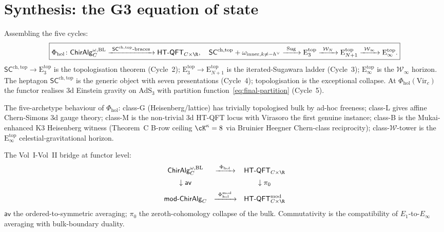 \documentclass{article}
\theoremstyle{definition}
\theoremstyle{remark}
\newcommand{\SCchtop}{\mathsf{SC}^{\mathrm{ch,top}}}
\newcommand{\Phihol}{\Phi_{\mathrm{hol}}}
\newcommand{\HTQFT}{\mathsf{HT\text{-}QFT}}
\newcommand{\ChirAlg}{\mathsf{ChirAlg}}
\newcommand{\Etop}[1]{\mathrm{E}_{#1}^{\mathrm{top}}}
\newcommand{\Vir}{\mathrm{Vir}}
\newcommand{\cW}{\mathcal{W}}
\newcommand{\hv}{h^{\vee}}
\begin{document}
\section{Synthesis: the G3 equation of state}
\label{sec:synthesis}

Assembling the five cycles:
\begin{equation}\label{eq:G3-full}
 \boxed{
 \Phihol\colon
 \ChirAlg^{\omega,\mathrm{BL}}_{C}
 \xrightarrow{\ \SCchtop\text{-braces}\ }
 \HTQFT_{C\times\R},
 \quad
 \SCchtop + \omega_{\mathrm{inner}, k\neq -\hv}
 \xrightarrow{\ \mathrm{Sug}\ } \Etop{3}
 \xrightarrow{\ \cW_N\ } \Etop{N+1}
 \xrightarrow{\ \cW_\infty\ } \Etop{\infty}.}
\end{equation}
$\SCchtop\to\Etop{3}$ is the topologisation theorem (Cycle~2);
$\Etop{3}\to\Etop{N+1}$ is the iterated-Sugawara ladder (Cycle~3);
$\Etop{\infty}$ is the $\cW_\infty$ horizon. The heptagon
$\SCchtop$ is the generic object with seven presentations
(Cycle~4); topologisation is the exceptional collapse. At
$\Phihol(\Vir_c)$ the functor realises 3d Einstein gravity on
AdS$_3$ with partition function~\eqref{eq:final-partition}
(Cycle~5).

The five-archetype behaviour of $\Phihol$: class-G
(Heisenberg/lattice) has trivially topologised bulk by ad-hoc
freeness; class-L gives affine Chern-Simons 3d gauge theory;
class-M is the non-trivial 3d HT-QFT locus with Virasoro the
first genuine instance; class-B is the Mukai-enhanced K3 Heisenberg
witness (Theorem~C B-row ceiling $\cK^\kappa = 8$ via Bruinier
Heegner Chern-class reciprocity); class-$\cW$-tower is the
$\Etop{\infty}$ celestial-gravitational horizon.

The Vol~I-Vol~II bridge at functor level:
\[
\begin{array}{ccc}
 \ChirAlg^{\omega,\mathrm{BL}}_{C} &
 \xrightarrow{\ \Phihol\ } &
 \HTQFT_{C\times\R} \\[0.5em]
 \downarrow\mathsf{av} & &
 \downarrow\pi_0 \\[0.5em]
 \mathsf{mod}\text{-}\ChirAlg_{C} &
 \xrightarrow{\ \Phihol^{\mathrm{mod}}\ } &
 \HTQFT_{C\times\R}^{\mathrm{mod}}
\end{array}
\]
$\mathsf{av}$ the ordered-to-symmetric averaging; $\pi_0$ the
zeroth-cohomology collapse of the bulk. Commutativity is the
compatibility of $E_1$-to-$E_\infty$ averaging with bulk-boundary
duality.
\end{document}
